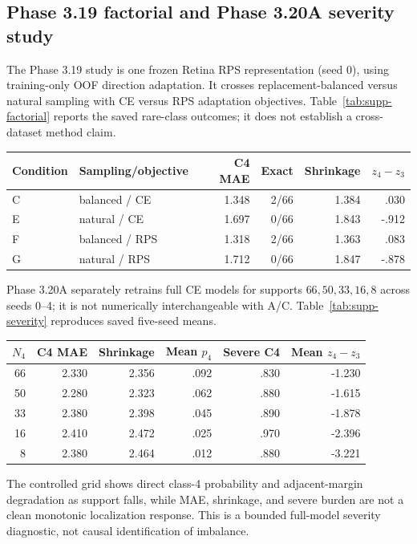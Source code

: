 \subsection{Phase 3.19 factorial and Phase 3.20A severity study}

The Phase 3.19 study is one frozen Retina RPS representation (seed 0), using
training-only OOF direction adaptation. It crosses replacement-balanced versus
natural sampling with CE versus RPS adaptation objectives. Table~\ref{tab:supp-factorial}
reports the saved rare-class outcomes; it does not establish a cross-dataset
method claim.

\begin{center}
\begin{tabular}{llrrrr}
\toprule
Condition & Sampling/objective & C4 MAE & Exact & Shrinkage & $z_4-z_3$ \\
\midrule
C & balanced / CE & 1.348 & 2/66 & 1.384 & .030 \\
E & natural / CE & 1.697 & 0/66 & 1.843 & -.912 \\
F & balanced / RPS & 1.318 & 2/66 & 1.363 & .083 \\
G & natural / RPS & 1.712 & 0/66 & 1.847 & -.878 \\
\bottomrule
\end{tabular}
\label{tab:supp-factorial}
\end{center}

Phase 3.20A separately retrains full CE models for supports
\(66,50,33,16,8\) across seeds 0--4; it is not numerically interchangeable
with A/C. Table~\ref{tab:supp-severity} reproduces saved five-seed means.

\begin{center}
\begin{tabular}{rrrrrr}
\toprule
$N_4$ & C4 MAE & Shrinkage & Mean $p_4$ & Severe C4 & Mean $z_4-z_3$ \\
\midrule
66 & 2.330 & 2.356 & .092 & .830 & -1.230 \\
50 & 2.280 & 2.323 & .062 & .880 & -1.615 \\
33 & 2.380 & 2.398 & .045 & .890 & -1.878 \\
16 & 2.410 & 2.472 & .025 & .970 & -2.396 \\
8 & 2.380 & 2.464 & .012 & .880 & -3.221 \\
\bottomrule
\end{tabular}
\label{tab:supp-severity}
\end{center}

The controlled grid shows direct class-4 probability and adjacent-margin
degradation as support falls, while MAE, shrinkage, and severe burden are not a
clean monotonic localization response. This is a bounded full-model severity
diagnostic, not causal identification of imbalance.
